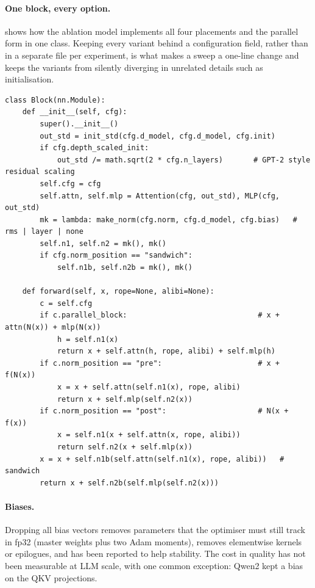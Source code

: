 \paragraph{One block, every option.}  shows how the ablation model implements
all four placements and the parallel form in one class. Keeping every variant behind a configuration
field, rather than in a separate file per experiment, is what makes a sweep a one-line change and keeps
the variants from silently diverging in unrelated details such as initialisation.

\begin{lstlisting}[caption={The configurable block of \texttt{llmsys/ablate.py}.},label={lst:archdesign:block}]
class Block(nn.Module):
    def __init__(self, cfg):
        super().__init__()
        out_std = init_std(cfg.d_model, cfg.d_model, cfg.init)
        if cfg.depth_scaled_init:
            out_std /= math.sqrt(2 * cfg.n_layers)       # GPT-2 style residual scaling
        self.cfg = cfg
        self.attn, self.mlp = Attention(cfg, out_std), MLP(cfg, out_std)
        mk = lambda: make_norm(cfg.norm, cfg.d_model, cfg.bias)   # rms | layer | none
        self.n1, self.n2 = mk(), mk()
        if cfg.norm_position == "sandwich":
            self.n1b, self.n2b = mk(), mk()

    def forward(self, x, rope=None, alibi=None):
        c = self.cfg
        if c.parallel_block:                              # x + attn(N(x)) + mlp(N(x))
            h = self.n1(x)
            return x + self.attn(h, rope, alibi) + self.mlp(h)
        if c.norm_position == "pre":                      # x + f(N(x))
            x = x + self.attn(self.n1(x), rope, alibi)
            return x + self.mlp(self.n2(x))
        if c.norm_position == "post":                     # N(x + f(x))
            x = self.n1(x + self.attn(x, rope, alibi))
            return self.n2(x + self.mlp(x))
        x = x + self.n1b(self.attn(self.n1(x), rope, alibi))   # sandwich
        return x + self.n2b(self.mlp(self.n2(x)))
\end{lstlisting}

\paragraph{Biases.} Dropping all bias vectors removes parameters that the optimiser must still track
in fp32 (master weights plus two Adam moments), removes elementwise kernels or epilogues, and has been
reported to help stability. The cost in quality has not been measurable at LLM scale, with one common
exception: Qwen2 kept a bias on the QKV projections.

